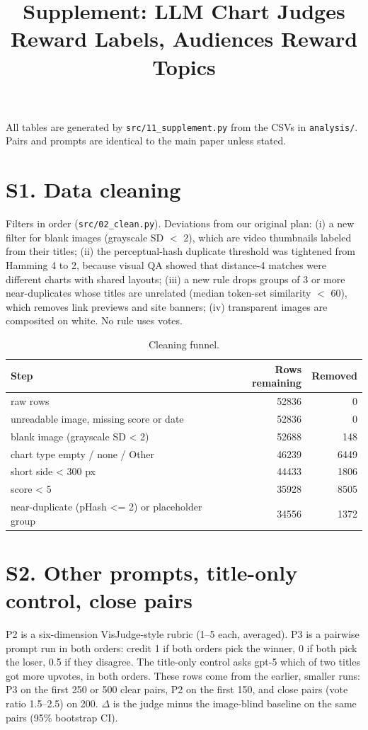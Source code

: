 \documentclass[10pt]{article}
\title{Supplement: LLM Chart Judges Reward Labels, Audiences Reward Topics}
\date{}
\begin{document}
\maketitle
All tables are generated by \texttt{src/11\_supplement.py} from the CSVs in \texttt{analysis/}. Pairs and prompts are identical to the main paper unless stated.

\section*{S1. Data cleaning}
Filters in order (\texttt{src/02\_clean.py}). Deviations from our original plan:
(i) a new filter for blank images (grayscale SD $<$ 2), which are video thumbnails labeled from their titles;
(ii) the perceptual-hash duplicate threshold was tightened from Hamming 4 to 2, because visual QA showed that distance-4 matches were different charts with shared layouts;
(iii) a new rule drops groups of 3 or more near-duplicates whose titles are unrelated (median token-set similarity $<$ 60), which removes link previews and site banners;
(iv) transparent images are composited on white.
No rule uses votes.

\begin{table}[h]\centering\small
\caption{Cleaning funnel.}
\begin{tabular}{lrr}
\toprule
Step & Rows remaining & Removed \\
\midrule
raw rows & 52836 & 0 \\
unreadable image, missing score or date & 52836 & 0 \\
blank image (grayscale SD < 2) & 52688 & 148 \\
chart type empty / none / Other & 46239 & 6449 \\
short side < 300 px & 44433 & 1806 \\
score < 5 & 35928 & 8505 \\
near-duplicate (pHash <= 2) or placeholder group & 34556 & 1372 \\
\bottomrule
\end{tabular}
\end{table}

\section*{S2. Other prompts, title-only control, close pairs}
P2 is a six-dimension VisJudge-style rubric (1--5 each, averaged). P3 is a pairwise prompt run in both orders: credit 1 if both orders pick the winner, 0 if both pick the loser, 0.5 if they disagree. The title-only control asks gpt-5 which of two titles got more upvotes, in both orders. These rows come from the earlier, smaller runs: P3 on the first 250 or 500 clear pairs, P2 on the first 150, and close pairs (vote ratio 1.5--2.5) on 200. $\Delta$ is the judge minus the image-blind baseline on the same pairs (95\% bootstrap CI).
\end{document}
